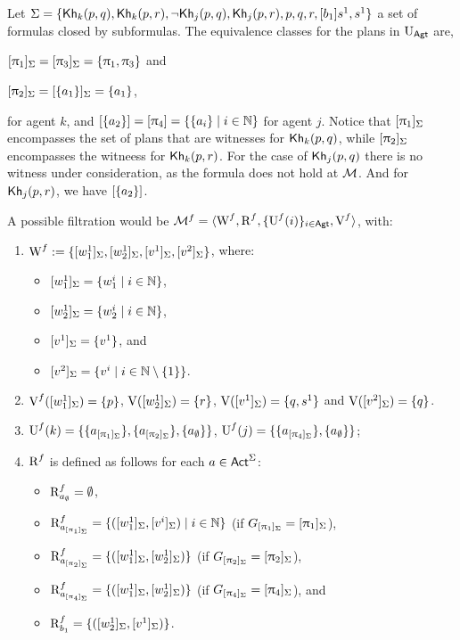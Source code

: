 \begin{example}
Let $\Sigma = \{ {\sf Kh}_k(p,q),{\sf Kh}_k(p,r),\neg{\sf Kh}_j(p,q),{\sf Kh}_j(p,r),p,q,r,[b_1] s^1,s^1 \}$ a set of formulas closed by subformulas.
The equivalence classes for the plans in $\operatorname{U}_{\rm \sf Agt}$ are,
\begin{inlineenum}
\item $[\uppi_1]_\Sigma = [\uppi_3]_\Sigma = \{ \uppi_1,\uppi_3 \}$ and
\item $[\uppi_2]_\Sigma = [\{ a_1 \}]_\Sigma= \{ a_1 \}$,
\end{inlineenum}
for agent $k$, and $[\{ a_2 \}] = [\uppi_4] = \{ \{ a_i \} \mid i \in \mathbb{N} \}$ for agent $j$.
Notice that $[\uppi_1]_\Sigma$ encompasses the set of plans that are witnesses for ${\sf Kh}_k(p,q)$, while $[\uppi_2]_\Sigma$ encompasses the witneess for ${\sf Kh}_k(p,r)$. For the case of ${\sf Kh}_j(p,q)$ there is no witness under consideration, as the formula does not hold at $\mathcal{M}$.   
And for ${\sf Kh}_j(p,r)$, we have $[\{ a_2 \}]$.

A possible filtration would be $\mathcal{M}^f = \langle \operatorname{W}^f,\operatorname{R}^f, \{ \operatorname{U}^f(i) \}_{i\in {\rm \sf Agt}}, \operatorname{V}^f \rangle$, with: 
\begin{enumerate}
\item $\operatorname{W}^f := \{ [w^1_1]_\Sigma,[w^1_2]_\Sigma,[v^1]_\Sigma,[v^2]_\Sigma \}$, where:
    \begin{itemize}
        \item $[w^1_1]_\Sigma=\{ w^i_1 \mid i \in \mathbb{N} \}$,
        \item $[w^1_2]_\Sigma=\{ w^i_2 \mid i \in \mathbb{N} \}$, 
        \item $[v^1]_\Sigma=\{ v^1 \}$, 
        and 
        \item $[v^2]_\Sigma=\{ v^i \mid i \in \mathbb{N} \setminus \{ 1 \} \}$.
    \end{itemize}
\item $\operatorname{V}^f([w^1_1]_\Sigma) = \{ p \}$, $\operatorname{V}([w^1_2]_\Sigma) = \{ r \}$, $\operatorname{V}([v^1]_\Sigma) = \{ q,s^1 \}$ and $\operatorname{V}([v^2]_\Sigma) = \{ q \}$.
\item
$\operatorname{U}^f(k) = \{ \{ a_{[\uppi_1]_\Sigma} \}, \{ a_{[\uppi_2]_\Sigma} \}, \{ a_\emptyset \} \}$,
$\operatorname{U}^f(j) = \{ \{ a_{[\uppi_4]_\Sigma} \}, \{ a_\emptyset \} \}$;
\item $\operatorname{R}^f$ is defined as follows for each $a \in {\rm \sf Act}^\Sigma$:
\begin{itemize}
\item $\operatorname{R}^f_{a_\emptyset} = \emptyset$,
\item $\operatorname{R}^f_{a_{[\uppi_1]_\Sigma}} = \{ ([w^1_1]_\Sigma,[v^i]_\Sigma) \mid i \in \mathbb{N} \}$ (if $G_{[\uppi_1]_\Sigma} = [\uppi_1]_\Sigma$),
\item $\operatorname{R}^f_{a_{[\uppi_2]_\Sigma}} = \{ ([w^1_1]_\Sigma,[w^1_2]_\Sigma) \}$ (if $G_{[\uppi_2]_\Sigma} = [\uppi_2]_\Sigma$),
\item $\operatorname{R}^f_{a_{[\uppi_4]_\Sigma}} = \{ ([w^1_1]_\Sigma,[w^1_2]_\Sigma) \}$ (if $G_{[\uppi_4]_\Sigma} = [\uppi_4]_\Sigma$), and 
\item $\operatorname{R}^f_{b_1} = \{ ([w^1_2]_\Sigma,[v^1]_\Sigma) \}$. %
\end{itemize}
\end{enumerate}


\end{example}
